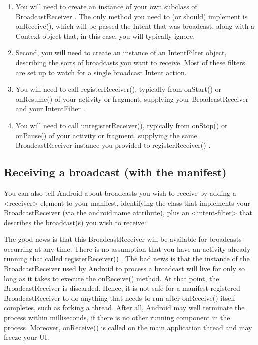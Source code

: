 \begin{enumerate}
	\item You will need to create an instance of your own subclass of
	BroadcastReceiver . The only method you need to (or should) implement is
	onReceive(), which will be passed the Intent that was broadcast, along with a
	Context object that, in this case, you will typically ignore. 
	\item Second, you will need to create an instance of an IntentFilter object, describing
	the sorts of broadcasts you want to receive. Most of these filters are set up to watch
	for a single broadcast Intent action.
	\item You will need to call registerReceiver(), typically from onStart() or onResume() of your
	activity or fragment, supplying your BroadcastReceiver and your IntentFilter .
	\item You will need to call unregisterReceiver(), typically from onStop() or onPause() of your
	activity or fragment, supplying the same BroadcastReceiver instance you provided
	to registerReceiver() .
\end{enumerate}

\subsection{Receiving a broadcast (with the manifest)}
You can also tell Android about broadcasts you wish to receive by adding a
<receiver> element to your manifest, identifying the class that implements your
BroadcastReceiver (via the android:name attribute), plus an <intent-filter> that
describes the broadcast(s) you wish to receive:



The good news is that this BroadcastReceiver will be available for broadcasts
occurring at any time. There is no assumption that you have an activity already
running that called registerReceiver() .
The bad news is that the instance of the BroadcastReceiver used by Android to
process a broadcast will live for only so long as it takes to execute the onReceive()
method. At that point, the BroadcastReceiver is discarded. Hence, it is not safe for
a manifest-registered BroadcastReceiver to do anything that needs to run after onReceive()
itself completes, such as forking a thread. After all, Android may well
terminate the process within milliseconds, if there is no other running component
in the process. Moreover, onReceive() is called on the main application thread and may freeze your UI.








